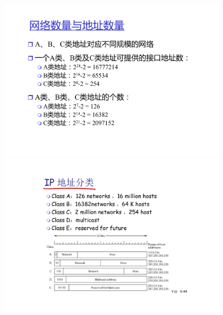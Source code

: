 \documentclass[]{report}
\begin{document}
			\begin{figure}[ht]
				\centering
				\begin{minipage}{20em}
					\centering
					\includegraphics[scale = 0.3]{images/IP_Address_ABC.pdf}
				\end{minipage}
				\begin{minipage}{20em}
					\centering
					\includegraphics[scale = 0.3]{images/IP_Address_ABCDE.pdf}
				\end{minipage}
			\end{figure}
\end{document}
